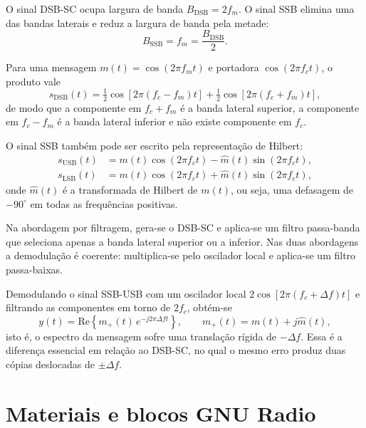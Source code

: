 \documentclass[11pt,a4paper]{article}
\begin{document}
O sinal DSB-SC ocupa largura de banda $B_\text{DSB} = 2 f_m$. O sinal SSB
elimina uma das bandas laterais e reduz a largura de banda pela metade:
\begin{equation}
  B_\text{SSB} = f_m = \frac{B_\text{DSB}}{2}.
\end{equation}

Para uma mensagem $m(t) = \cos(2\pi f_m t)$ e portadora $\cos(2\pi f_c t)$,
o produto vale
\begin{equation}
  s_\text{DSB}(t) = \tfrac{1}{2}\cos\!\left[2\pi (f_c - f_m) t\right]
                  + \tfrac{1}{2}\cos\!\left[2\pi (f_c + f_m) t\right],
\end{equation}
de modo que a componente em $f_c + f_m$ é a banda lateral superior, a
componente em $f_c - f_m$ é a banda lateral inferior e não existe componente
em $f_c$.

O sinal SSB também pode ser escrito pela representação de Hilbert:
\begin{align}
  s_\text{USB}(t) &= m(t)\cos(2\pi f_c t) - \hat{m}(t)\sin(2\pi f_c t), \\
  s_\text{LSB}(t) &= m(t)\cos(2\pi f_c t) + \hat{m}(t)\sin(2\pi f_c t),
\end{align}
onde $\hat{m}(t)$ é a transformada de Hilbert de $m(t)$, ou seja, uma
defasagem de $-90^\circ$ em todas as frequências positivas.

Na abordagem por filtragem, gera-se o DSB-SC e aplica-se um filtro passa-banda
que seleciona apenas a banda lateral superior ou a inferior. Nas duas
abordagens a demodulação é coerente: multiplica-se pelo oscilador local e
aplica-se um filtro passa-baixas.

Demodulando o sinal SSB-USB com um oscilador local $2\cos[2\pi(f_c+\Delta f)t]$
e filtrando as componentes em torno de $2f_c$, obtém-se
\begin{equation}
  y(t) = \mathrm{Re}\!\left\{ m_+(t)\, e^{-j 2\pi \Delta f t} \right\},
  \qquad m_+(t) = m(t) + j\hat{m}(t),
\end{equation}
isto é, o espectro da mensagem sofre uma translação rígida de $-\Delta f$.
Essa é a diferença essencial em relação ao DSB-SC, no qual o mesmo erro
produz duas cópias deslocadas de $\pm\Delta f$.

\section{Materiais e blocos GNU Radio}
\end{document}
